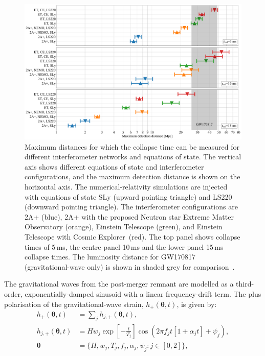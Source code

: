 \documentclass[
reprint,
prd,
twocolumn,
nofootinbib,
 amsmath,
showpacs ,amssymb, aps,%
superscriptaddress
]{revtex4-1}
\begin{document}
\begin{figure}[t]
    \centering
    \includegraphics[scale=0.29]{images/MaximumDistancePanelLabelledGW170817.pdf}
    \caption{Maximum distances for which the collapse time can be measured for different interferometer networks and equations of state. The vertical axis shows different equations of state and interferometer configurations, and the maximum detection distance is shown on the horizontal axis. The numerical-relativity simulations are injected with equations of state SLy (upward pointing triangle) and LS220 (downward pointing triangle). The interferometer configurations are 2A+ (blue), 2A+ with the proposed Neutron star Extreme Matter Observatory (orange), Einstein Telescope (green), and Einstein Telescope with Cosmic Explorer~(red). The top panel shows collapse times of 5\,ms, the centre panel 10\,ms and the lower panel 15\,ms collapse times. The  luminosity distance for GW170817 (gravitational-wave only) is shown in shaded grey for comparison~\cite{GW170817multi}.} 
    \label{fig:CollapseTimeDistanceGrid}
\end{figure}  
        The gravitational waves from the post-merger remnant are modelled as a third-order, exponentially-damped sinusoid with a linear frequency-drift term. The plus polarisation of the gravitational-wave strain, $h_{+}(\boldsymbol{\theta},t)$, is given by: 
\begin{align}
        h_{+}(\boldsymbol{\theta},t) & = \sum_{j} h_{j,+}(\boldsymbol{\theta},t),\nonumber\\
        h_{j,+}(\boldsymbol{\theta},t) & = 
        H w_j \exp\left[-\frac{t}{T_j}\right] \cos \left(2\pi f_j t\left[1+\alpha_j t\right]+\psi_j \right),\nonumber\\
        \boldsymbol{\theta} & = \{H,w_j,T_j,f_j,\alpha_j,\psi_j :  j \in [0,2] \},\label{eq:hplus}
\end{align}
\end{document}

